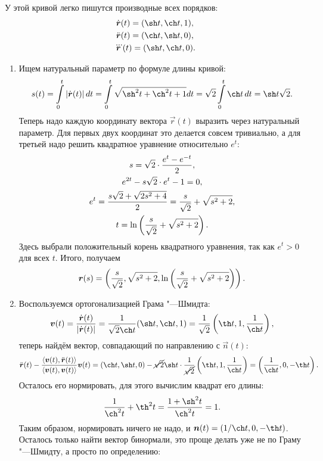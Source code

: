 \begin{solution}
	У этой кривой легко пишутся производные всех порядков:
	\begin{gather*}
		\dot{\vec{r}}(t) = (\sh t, \ch t, 1),\\
		\ddot{\vec{r}}(t) = (\ch t, \sh t, 0),\\
		\dddot{\vec{r}}(t) = (\sh t, \ch t, 0).
	\end{gather*}
	\begin{enumerate}[nolistsep, label=(\arabic*)]
		\item Ищем натуральный параметр по формуле длины кривой:
			\[
				s(t) = \int\limits_0^t\abs{\dot{\vec{r}}(t)}dt = \int\limits_0^t\sqrt{\sh^2t + \ch^2t + 1}dt = \sqrt{2}\int\limits_0^t\ch t\,dt = \sh t\sqrt{2}.
			\]
			Теперь надо каждую координату вектора $\vec{r}(t)$ выразить через натуральный параметр. Для первых двух координат это делается совсем тривиально, а для третьей надо решить квадратное уравнение относительно $e^t$:
			\begin{gather*}
				s = \sqrt{2} \cdot \frac{e^t - e^{-t}}{2},\\
				e^{2t} - s\sqrt{2} \cdot e^t - 1 = 0,\\
				e^t = \frac{s\sqrt{2} + \sqrt{2s^2 + 4}}{2} = \frac{s}{\sqrt{2}} + \sqrt{s^2 + 2},\\
				t = \ln\left(\frac{s}{\sqrt{2}} + \sqrt{s^2 + 2}\right).
			\end{gather*}
			Здесь выбрали положительный корень квадратного уравнения, так как $e^t > 0$ для всех $t$. Итого, получаем
			\[
				\boldsymbol{r}(s) = \left(\frac{s}{\sqrt{2}}, \sqrt{s^2 + 2}, \ln\left(\frac{s}{\sqrt{2}} + \sqrt{s^2 + 2}\right)\right).
			\]
		\item Воспользуемся ортогонализацией Грама "---Шмидта:
			\[
				\vec{v}(t) = \frac{\dot{\vec{r}}(t)}{\abs{\dot{\vec{r}}(t)}} = \frac{1}{\sqrt{2}\ch t}(\sh t, \ch t, 1) = \frac{1}{\sqrt{2}}\br{\th t, 1, \frac{1}{\ch t}},
			\]
			теперь найдём вектор, совпадающий по направлению с $\vec{n}(t)$:
			\[
				\ddot{\vec{r}}(t) - \frac{\langle \vec{v}(t), \ddot{\vec{r}}(t) \rangle}{\langle \vec{v}(t), \vec{v}(t)\rangle}\vec{v}(t) = (\ch t, \sh t, 0) - \cancel{\sqrt{2}}\sh t \cdot \frac{1}{\cancel{\sqrt{2}}}\br{\th t, 1, \frac{1}{\ch t}} = \br{\frac{1}{\ch t}, 0, -\th t}.
			\]
			Осталось его нормировать, для этого вычислим квадрат его длины:
			\[
				\frac{1}{\ch^2t} + \th^2t = \frac{1 + \sh^2t}{\ch^2t} = 1.
			\]
			Таким образом, нормировать ничего не надо, и $\vec{n}(t) = (1 / \ch t, 0, -\th t)$. Осталось только найти вектор бинормали, это проще делать уже не по Граму "---Шмидту, а просто по определению:

\end{enumerate}
\end{solution}
